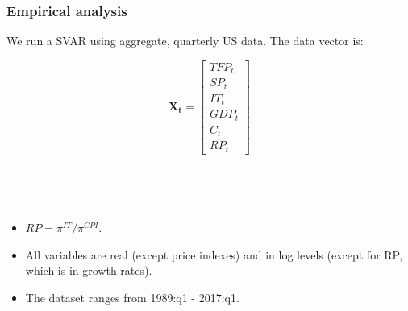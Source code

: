 \documentclass{beamer}
\begin{document}
\begin{frame}
	\frametitle{Empirical analysis}

	We run a SVAR using aggregate, quarterly US data. The data vector is:
	
	\begin{equation}
	\mathbf{X_t} = 
	\begin{bmatrix}
    TFP_t      \\
 
   SP_t   \\
   
   IT_t \\
   
   GDP_t \\
   
   C_t \\
   
   RP_t
\end{bmatrix}
	\end{equation}
	


\

\

\begin{itemize}
\item $RP = \pi^{IT}/\pi^{CPI}$. 
\item All variables are real (except price indexes) and in log levels (except for RP, which is in growth rates). 
\item The dataset ranges from 1989:q1 - 2017:q1.
\end{itemize}	
	
\end{frame}
\end{document}
